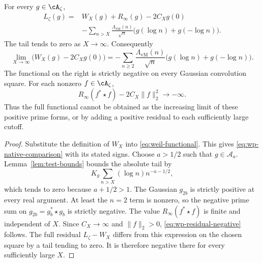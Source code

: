 \begin{proposition}
\label{prop:wp-native-comparison}
For every $g\in\cA_\zeta$,
\begin{equation}
 \begin{split}
 L_\zeta(g)={}&W_X(g)+R_\infty(g)-2C_Xg(0)\\
 &-\sum_{n>X}\frac{\Lambda_{\mathrm{vM}}(n)}{\sqrt n}
                            \bigl(g(\log n)+g(-\log n)\bigr).
 \end{split}
 \label{eq:wp-native-comparison}
\end{equation}
The tail tends to zero as $X\to\infty$.
Consequently
\[
 \lim_{X\to\infty}\bigl(W_X(g)-2C_Xg(0)\bigr)
 =-\sum_{n\geq2}\frac{\Lambda_{\mathrm{vM}}(n)}{\sqrt n}
                            \bigl(g(\log n)+g(-\log n)\bigr).
\]
The functional on the right is strictly negative on every Gaussian
convolution square.
For each nonzero $f\in\cA_\zeta$,
\begin{equation}
 R_\infty(f^*\star f)-2C_X\|f\|_2^2\longrightarrow-\infty.
 \label{eq:wp-residual-negative}
\end{equation}
Thus the full functional cannot be obtained as the increasing limit of
these positive prime forms, or by adding a positive residual to each
sufficiently large cutoff.
\end{proposition}
\begin{proof}
Substitute the definition of $W_X$ into \eqref{eq:weil-functional}.
This gives \eqref{eq:wp-native-comparison} with its stated signs.
Choose $a>1/2$ such that $g\in\mathcal A_a$.
Lemma~\ref{lem:test-bounds} bounds the absolute tail by
\[
 K_g\sum_{n>X}(\log n)n^{-a-1/2},
\]
which tends to zero because $a+1/2>1$.
The Gaussian $g_{2b}$ is strictly positive at every real argument.
At least the $n=2$ term is nonzero, so the negative prime sum on
$g_{2b}=g_b^*\star g_b$ is strictly negative.
The value $R_\infty(f^*\star f)$ is finite and independent of $X$.
Since $C_X\to\infty$ and $\|f\|_2>0$,
\eqref{eq:wp-residual-negative} follows.
The full residual $L_\zeta-W_X$ differs from this expression on the
chosen square by a tail tending to zero.
It is therefore negative there for every sufficiently large $X$.
\end{proof}

